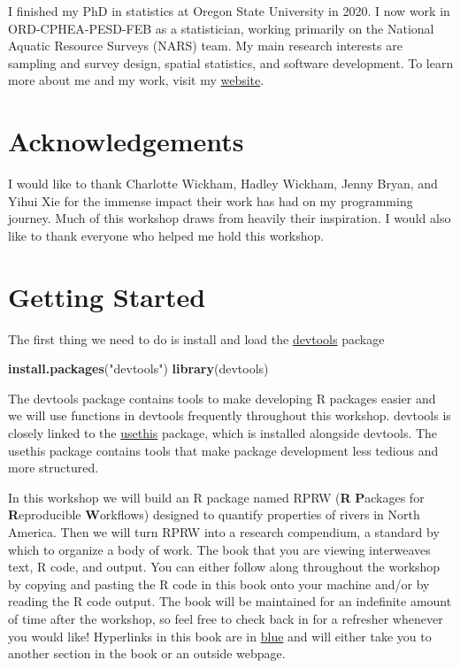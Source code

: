 \documentclass[
]{book}
\newenvironment{Shaded}{\begin{snugshade}}{\end{snugshade}}
\newcommand{\KeywordTok}[1]{\textcolor[rgb]{0.13,0.29,0.53}{\textbf{#1}}}
\newcommand{\NormalTok}[1]{#1}
\newcommand{\StringTok}[1]{\textcolor[rgb]{0.31,0.60,0.02}{#1}}
\begin{document}
I finished my PhD in statistics at Oregon State University in 2020. I now work in ORD-CPHEA-PESD-FEB as a statistician, working primarily on the National Aquatic Resource Surveys (NARS) team. My main research interests are sampling and survey design, spatial statistics, and software development. To learn more about me and my work, visit my \href{https://michaeldumelle.github.io/}{website}.

\hypertarget{acknowledgements}{%
\section*{Acknowledgements}\label{acknowledgements}}

I would like to thank Charlotte Wickham, Hadley Wickham, Jenny Bryan, and Yihui Xie for the immense impact their work has had on my programming journey. Much of this workshop draws from heavily their inspiration. I would also like to thank everyone who helped me hold this workshop.

\hypertarget{getting-started}{%
\section*{Getting Started}\label{getting-started}}

The first thing we need to do is install and load the \href{https://devtools.r-lib.org/}{devtools} package

\begin{Shaded}
\begin{Highlighting}[]
\KeywordTok{install.packages}\NormalTok{(}\StringTok{"devtools"}\NormalTok{)}
\KeywordTok{library}\NormalTok{(devtools)}
\end{Highlighting}
\end{Shaded}

The devtools package contains tools to make developing R packages easier and we will use functions in devtools frequently throughout this workshop. devtools is closely linked to the \href{https://usethis.r-lib.org/}{usethis} package, which is installed alongside devtools. The usethis package contains tools that make package development less tedious and more structured.

In this workshop we will build an R package named RPRW (\textbf{R} \textbf{P}ackages for \textbf{R}eproducible \textbf{W}orkflows) designed to quantify properties of rivers in North America. Then we will turn RPRW into a research compendium, a standard by which to organize a body of work. The book that you are viewing interweaves text, R code, and output. You can either follow along throughout the workshop by copying and pasting the R code in this book onto your machine and/or by reading the R code output. The book will be maintained for an indefinite amount of time after the workshop, so feel free to check back in for a refresher whenever you would like! Hyperlinks in this book are in \href{}{blue} and will either take you to another section in the book or an outside webpage.
\end{document}
